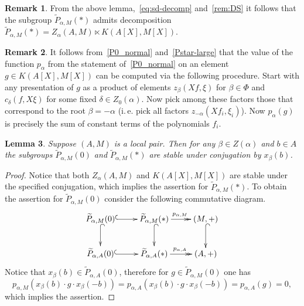 \documentclass[oneside, 8pt]{amsart}
\newtheorem{lemma}{Lemma}
\theoremstyle{remark}
\theoremstyle{definition}
\numberwithin{lemma}{section}
\numberwithin{prop}{section}
\numberwithin{corollary}{section}
\numberwithin{externaltheorem}{section}
\newtheorem{rem}[lemma]{Remark}
\numberwithin{equation}{section}
\begin{document}
\begin{rem} \label{Pstar-char} From the above lemma,~\eqref{eq:sd-decomp} and~\cref{rem:DS} it follows that the subgroup $\widetilde{P}_{\alpha, M}(*)$ admits decomposition $\widetilde{P}_{\alpha, M}(*) = Z_\alpha(A, M) \ltimes K(A[X], M[X]).$ \end{rem} 

\begin{rem} \label{rem:palpha} It follows from~\cref{P0_normal} and~\cref{Pstar-large} that the value of the function $p_\alpha$ from the statement of~\cref{P0_normal} on an element $g\in K(A[X], M[X])$ can be computed via the following procedure. 
Start with any presentation of $g$ as a product of elements $z_{\beta}(Xf, \xi)$ for $\beta \in \Phi$ and $c_\delta(f, X\xi)$ for some fixed $\delta\in Z_0(\alpha)$. 
Now pick among these factors those that correspond to the root $\beta = -\alpha$ (i.\,e. pick all factors $z_{-\alpha}(Xf_i, \xi_i)$). 
Now $p_\alpha(g)$ is precisely the sum of constant terms of the polynomials $f_i$. \end{rem}

\begin{lemma} \label{P0-conj-invariant} Suppose $(A, M)$ is a local pair. Then for any $\beta \in Z(\alpha)$ and $b \in A$ the subgroups $\widetilde{P}_{\alpha, M}(0)$ and $\widetilde{P}_{\alpha, M}(*)$ are stable under conjugation by $x_\beta(b)$. \end{lemma}
\begin{proof}
Notice that both $Z_\alpha(A, M)$ and $K(A[X], M[X])$ are stable under the specified conjugation, which implies the assertion for $\widetilde{P}_{\alpha, M}(*)$. 
To obtain the assertion for $\widetilde{P}_{\alpha, M}(0)$ consider the following commutative diagram. \[ \xymatrix{ \widetilde{P}_{\alpha, M}(0) \ar@{^{(}->}[r] \ar@{^{(}->}[d] & \widetilde{P}_{\alpha, M}(*) \ar@{->>}[r]^{p_{\alpha, M}} \ar@{^{(}->}[d] & (M, +) \ar@{^{(}->}[d] \\ \widetilde{P}_{\alpha, A}(0) \ar@{^{(}->}[r] & \widetilde{P}_{\alpha, A}(*) \ar@{->>}[r]^{p_{\alpha, A}} & (A, +)} \]
Notice that $x_\beta(b) \in \widetilde{P}_{\alpha, A}(0)$, therefore for $g \in \widetilde{P}_{\alpha, M}(0)$ one has \[p_{\alpha, M}(x_\beta(b) \cdot g \cdot x_\beta(-b)) = p_{\alpha, A}(x_\beta(b) \cdot g \cdot x_\beta(-b)) = p_{\alpha, A}(g) = 0,\] which implies the assertion.\end{proof}
\end{document}
